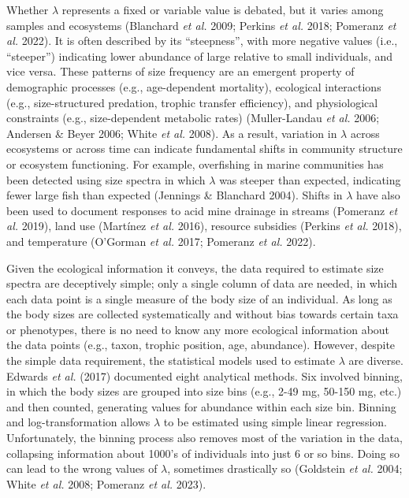 \documentclass[
  12pt,
]{article}
\begin{document}
Whether \(\lambda\) represents a fixed or variable value is debated, but
it varies among samples and ecosystems (Blanchard \emph{et al.} 2009;
Perkins \emph{et al.} 2018; Pomeranz \emph{et al.} 2022). It is often
described by its ``steepness'', with more negative values (i.e.,
``steeper'') indicating lower abundance of large relative to small
individuals, and vice versa. These patterns of size frequency are an
emergent property of demographic processes (e.g., age-dependent
mortality), ecological interactions (e.g., size-structured predation,
trophic transfer efficiency), and physiological constraints (e.g.,
size-dependent metabolic rates) (Muller-Landau \emph{et al.} 2006;
Andersen \& Beyer 2006; White \emph{et al.} 2008). As a result,
variation in \(\lambda\) across ecosystems or across time can indicate
fundamental shifts in community structure or ecosystem functioning. For
example, overfishing in marine communities has been detected using size
spectra in which \(\lambda\) was steeper than expected, indicating fewer
large fish than expected (Jennings \& Blanchard 2004). Shifts in
\(\lambda\) have also been used to document responses to acid mine
drainage in streams (Pomeranz \emph{et al.} 2019), land use (Martínez
\emph{et al.} 2016), resource subsidies (Perkins \emph{et al.} 2018),
and temperature (O'Gorman \emph{et al.} 2017; Pomeranz \emph{et al.}
2022).

Given the ecological information it conveys, the data required to
estimate size spectra are deceptively simple; only a single column of
data are needed, in which each data point is a single measure of the
body size of an individual. As long as the body sizes are collected
systematically and without bias towards certain taxa or phenotypes,
there is no need to know any more ecological information about the data
points (e.g., taxon, trophic position, age, abundance). However, despite
the simple data requirement, the statistical models used to estimate
\(\lambda\) are diverse. Edwards \emph{et al.} (2017) documented eight
analytical methods. Six involved binning, in which the body sizes are
grouped into size bins (e.g., 2-49 mg, 50-150 mg, etc.) and then
counted, generating values for abundance within each size bin. Binning
and log-transformation allows \(\lambda\) to be estimated using simple
linear regression. Unfortunately, the binning process also removes most
of the variation in the data, collapsing information about 1000's of
individuals into just 6 or so bins. Doing so can lead to the wrong
values of \(\lambda\), sometimes drastically so (Goldstein \emph{et al.}
2004; White \emph{et al.} 2008; Pomeranz \emph{et al.} 2023).
\end{document}
